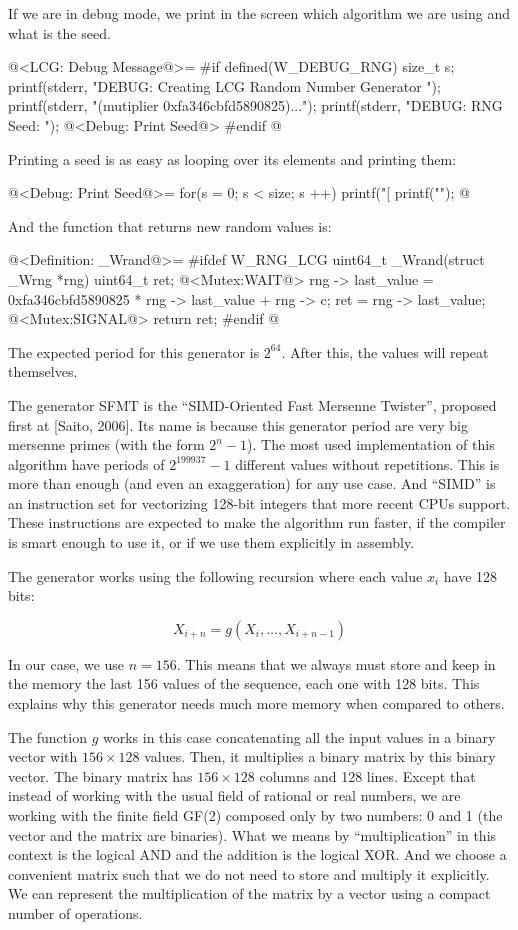 If we are in debug mode, we print in the screen which algorithm we are
using and what is the seed.

\iniciocodigo
@<LCG: Debug Message@>=
#if defined(W_DEBUG_RNG)
{
  size_t s;
  printf(stderr, "DEBUG: Creating LCG Random Number Generator ");
  printf(stderr, "(mutiplier 0xfa346cbfd5890825)...\n");
  printf(stderr, "DEBUG: RNG Seed: ");
  @<Debug: Print Seed@>
}
#endif
@
\fimcodigo

Printing a seed is as easy as looping over its elements and printing
them:

\iniciocodigo
@<Debug: Print Seed@>=
for(s = 0; s < size; s ++){
  printf("[%
}
printf("\n");
@
\fimcodigo

And the function that returns new random values is:

\iniciocodigo
@<Definition: \_Wrand@>=
#ifdef W_RNG_LCG
uint64_t _Wrand(struct _Wrng *rng){
  uint64_t ret;
  @<Mutex:WAIT@>
  rng -> last_value = 0xfa346cbfd5890825 * rng -> last_value + rng -> c;
  ret = rng -> last_value;
  @<Mutex:SIGNAL@>
  return ret;
}
#endif
@
\fimcodigo

The expected period for this generator is $2^{64}$. After this, the
values will repeat themselves.


The generator SFMT is the ``SIMD-Oriented Fast Mersenne Twister'',
proposed first at [Saito, 2006]. Its name is because this generator
period are very big mersenne primes (with the form $2^n-1$). The most
used implementation of this algorithm have periods of $2^{199937}-1$
different values without repetitions. This is more than enough (and
even an exaggeration) for any use case. And ``SIMD'' is an instruction
set for vectorizing 128-bit integers that more recent CPUs
support. These instructions are expected to make the algorithm run
faster, if the compiler is smart enough to use it, or if we use them
explicitly in assembly.

The generator works using the following recursion where each value
$x_i$ have 128 bits:

$$
X_{i+n}=g(X_i, \ldots, X_{i+n-1})
$$

In our case, we use $n=156$. This means that we always must store and
keep in the memory the last 156 values of the sequence, each one with
128 bits. This explains why this generator needs much more memory when
compared to others.

The function $g$ works in this case concatenating all the input values
in a binary vector with $156 \times 128$ values. Then, it multiplies a
binary matrix by this binary vector. The binary matrix has $156 \times
128$ columns and 128 lines. Except that instead of working with the
usual field of rational or real numbers, we are working with the
finite field GF(2) composed only by two numbers: 0 and 1 (the vector
and the matrix are binaries). What we means by ``multiplication'' in
this context is the logical AND and the addition is the logical
XOR. And we choose a convenient matrix such that we do not need to
store and multiply it explicitly. We can represent the multiplication
of the matrix by a vector using a compact number of operations.


